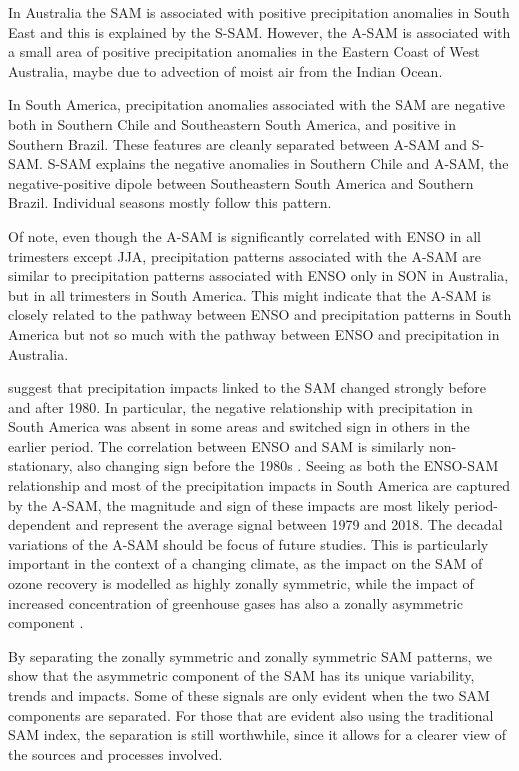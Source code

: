 \documentclass[smallextended]{svjour3}       %
\begin{document}
In Australia the SAM is associated with positive precipitation anomalies in South East and this is explained by the S\nobreakdash-SAM.
However, the A\nobreakdash-SAM is associated with a small area of positive precipitation anomalies in the Eastern Coast of West Australia, maybe due to advection of moist air from the Indian Ocean.

In South America, precipitation anomalies associated with the SAM are negative both in Southern Chile and Southeastern South America, and positive in Southern Brazil.
These features are cleanly separated between A\nobreakdash-SAM and S\nobreakdash-SAM.
S\nobreakdash-SAM explains the negative anomalies in Southern Chile and A\nobreakdash-SAM, the negative-positive dipole between Southeastern South America and Southern Brazil.
Individual seasons mostly follow this pattern.

Of note, even though the A\nobreakdash-SAM is significantly correlated with ENSO in all trimesters except JJA, precipitation patterns associated with the A\nobreakdash-SAM are similar to precipitation patterns associated with ENSO only in SON in Australia, but in all trimesters in South America.
This might indicate that the A\nobreakdash-SAM is closely related to the pathway between ENSO and precipitation patterns in South America but not so much with the pathway between ENSO and precipitation in Australia.

\citet{silvestri2009} suggest that precipitation impacts linked to the SAM changed strongly before and after 1980.
In particular, the negative relationship with precipitation in South America was absent in some areas and switched sign in others in the earlier period.
The correlation between ENSO and SAM is similarly non-stationary, also changing sign before the 1980s \citep{fogt2006, clem2013}.
Seeing as both the ENSO\nobreakdash-SAM relationship and most of the precipitation impacts in South America are captured by the A\nobreakdash-SAM, the magnitude and sign of these impacts are most likely period-dependent and represent the average signal between 1979 and 2018.
The decadal variations of the A\nobreakdash-SAM should be focus of future studies.
This is particularly important in the context of a changing climate, as the impact on the SAM of ozone recovery is modelled as highly zonally symmetric, while the impact of increased concentration of greenhouse gases has also a zonally asymmetric component \citep{arblaster2006}.

By separating the zonally symmetric and zonally symmetric SAM patterns, we show that the asymmetric component of the SAM has its unique variability, trends and impacts.
Some of these signals are only evident when the two SAM components are separated.
For those that are evident also using the traditional SAM index, the separation is still worthwhile, since it allows for a clearer view of the sources and processes involved.
\end{document}
